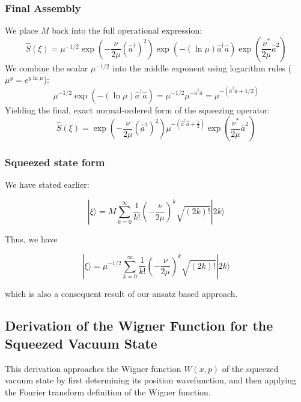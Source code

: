 {\subsubsection{Final Assembly}
We place $M$ back into the full operational expression:
\begin{equation*}
\hat{S}(\xi) = \mu^{-1/2} \exp\left(-\frac{\nu}{2\mu}(\hat{a}^\dagger)^2\right) \exp\left(-(\ln\mu)\hat{a}^\dagger\hat{a}\right) \exp\left(\frac{\nu^*}{2\mu}\hat{a}^2\right)
\end{equation*}
We combine the scalar $\mu^{-1/2}$ into the middle exponent using logarithm rules ($\mu^y = e^{y\ln\mu}$):
\begin{equation*}
\mu^{-1/2} \exp\left(-(\ln\mu)\hat{a}^\dagger\hat{a}\right) = \mu^{-1/2} \mu^{-\hat{a}^\dagger\hat{a}} = \mu^{-(\hat{a}^\dagger\hat{a} + 1/2)}
\end{equation*}
Yielding the final, exact normal-ordered form of the squeezing operator:
\begin{equation}
\hat{S}(\xi) = \exp\left(-\frac{\nu}{2\mu}(\hat{a}^\dagger)^2\right)\mu^{-(\hat{a}^\dagger\hat{a}+\frac{1}{2})}\exp\left(\frac{\nu^*}{2\mu}\hat{a}^2\right)
\end{equation}

\subsubsection{Squeezed state form}

We have stated earlier:

\begin{equation*}
|\xi\rangle = M \sum_{k=0}^{\infty} \frac{1}{k!} \left(-\frac{\nu}{2\mu}\right)^k \sqrt{(2k)!} |2k\rangle
\end{equation*}

Thus, we have

\begin{equation}
|\xi\rangle = \mu^{-1/2} \sum_{k=0}^{\infty} \frac{1}{k!} \left(-\frac{\nu}{2\mu}\right)^k \sqrt{(2k)!} |2k\rangle
\end{equation}

which is also a consequent result of our ansatz based approach.



\subsection{Derivation of the Wigner Function for the Squeezed Vacuum State}

This derivation approaches the Wigner function $W(x,p)$ of the squeezed vacuum state by first determining its position wavefunction, and then applying the Fourier transform definition of the Wigner function.

}

